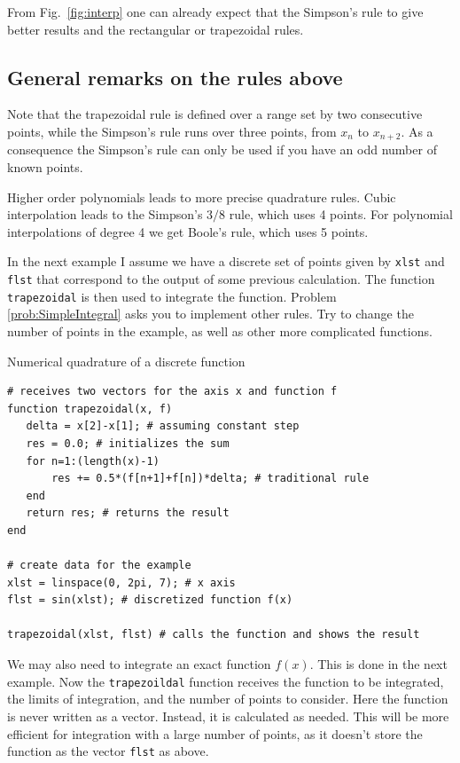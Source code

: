 From Fig.~\ref{fig:interp} one can already expect that the Simpson's rule to give better results and the rectangular or trapezoidal rules.

\subsection*{General remarks on the rules above}

Note that the trapezoidal rule is defined over a range set by two consecutive points, while the Simpson's rule runs over three points, from $x_n$ to $x_{n+2}$. As a consequence the Simpson's rule can only be used if you have an odd number of known points.

Higher order polynomials leads to more precise quadrature rules. Cubic interpolation leads to the Simpson's $3/8$ rule, which uses 4 points. For polynomial interpolations of degree 4 we get Boole's rule, which uses 5 points.

In the next example I assume we have a discrete set of points given by \texttt{xlst} and \texttt{flst} that correspond to the output of some previous calculation. The function \texttt{trapezoidal} is then used to integrate the function. Problem \ref{prob:SimpleIntegral} asks you to implement other rules. Try to change the number of points in the example, as well as other more complicated functions.

\begin{example}{Numerical quadrature of a discrete function}
\label{ex:numericalquadrature}
\begin{verbatim}
# receives two vectors for the axis x and function f
function trapezoidal(x, f)
   delta = x[2]-x[1]; # assuming constant step
   res = 0.0; # initializes the sum
   for n=1:(length(x)-1)
       res += 0.5*(f[n+1]+f[n])*delta; # traditional rule
   end
   return res; # returns the result
end

# create data for the example
xlst = linspace(0, 2pi, 7); # x axis
flst = sin(xlst); # discretized function f(x)

trapezoidal(xlst, flst) # calls the function and shows the result
\end{verbatim}
\end{example}

We may also need to integrate an exact function $f(x)$. This is done in the next example. Now the \texttt{trapezoildal} function receives the function to be integrated, the limits of integration, and the number of points to consider. Here the function is never written as a vector. Instead, it is calculated as needed. This will be more efficient for integration with a large number of points, as it doesn't store the function as the vector \texttt{flst} as above.

